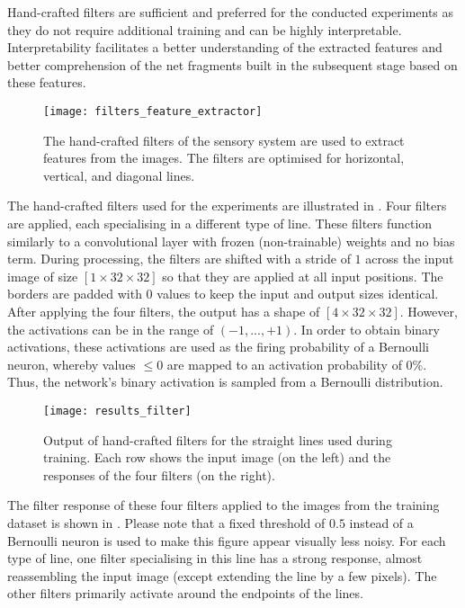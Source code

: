 Hand-crafted filters are sufficient and preferred for the conducted experiments as they do not require additional training and can be highly interpretable. Interpretability facilitates a better understanding of the extracted features and better comprehension of the net fragments built in the subsequent stage based on these features. 

\begin{figure}[h]
    \centering
    \texttt{[image: filters\_feature\_extractor]}
    \caption[Hand-crafted filters of the sensory system]{The hand-crafted filters of the sensory system are used to extract features from the images. The filters are optimised for horizontal, vertical, and diagonal lines.}
\end{figure}

The hand-crafted filters used for the experiments are illustrated in .
Four filters are applied, each specialising in a different type of line.
These filters function similarly to a convolutional layer with frozen (non-trainable) weights and no bias term. 
During processing, the filters are shifted with a stride of $1$ across the input image of size $[1 \times 32 \times 32]$ so that they are applied at all input positions. 
The borders are padded with $0$ values to keep the input and output sizes identical.
After applying the four filters, the output has a shape of $[4 \times 32 \times 32]$. 
However, the activations can be in the range of $(-1, ..., +1)$.
In order to obtain binary activations, these activations are used as the firing probability of a Bernoulli neuron, whereby values $\leq 0$ are mapped to an activation probability of $0\%$.
Thus, the network's binary activation is sampled from a Bernoulli distribution.


\begin{figure}[h]
    \centering
    \texttt{[image: results\_filter]}
    \caption[Output of hand-crafted filters for straight lines]{Output of hand-crafted filters for the straight lines used during training. Each row shows the input image (on the left) and the responses of the four filters (on the right).}
\end{figure}

The filter response of these four filters applied to the images from the training dataset is shown in .
Please note that a fixed threshold of $0.5$ instead of a Bernoulli neuron is used to make this figure appear visually less noisy.
For each type of line, one filter specialising in this line has a strong response, almost reassembling the input image (except extending the line by a few pixels).
The other filters primarily activate around the endpoints of the lines.


